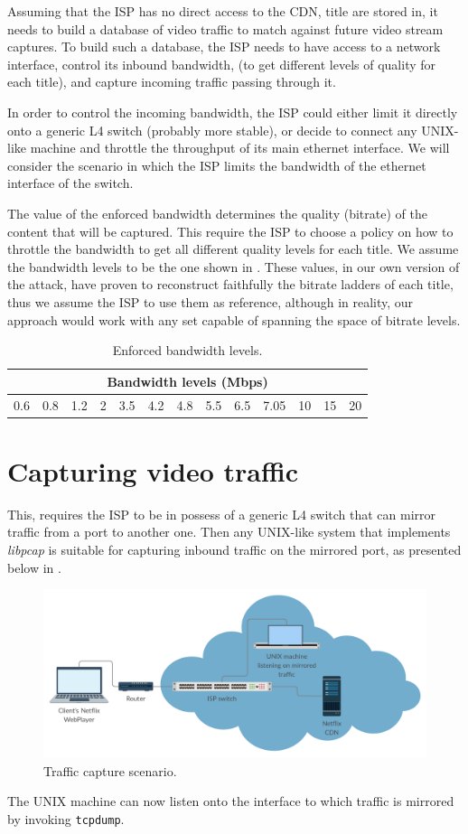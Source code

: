 Assuming that the ISP has no direct access to the CDN, title are stored in, it
needs to build a database of video traffic to match against future video stream
captures. To build such a database, the ISP needs to have access to a network
interface, control its inbound bandwidth, (to get different levels of quality
for each title), and capture incoming traffic passing through it.

In order to control the incoming bandwidth, the ISP could either limit it
directly onto a generic L4 switch (probably more stable), or decide to connect
any UNIX-like machine and throttle the throughput of its main ethernet
interface. We will consider the scenario in which the ISP limits the bandwidth
of the ethernet interface of the switch.

The value of the enforced bandwidth determines the quality (bitrate) of the
content that will be captured. This require the ISP to choose a policy on how
to throttle the bandwidth to get all different quality levels for each title.
We assume the bandwidth levels to be the one shown in .
These values, in our own version of the attack, have proven to reconstruct
faithfully the bitrate ladders of each title, thus we assume the ISP to use
them as reference, although in reality, our approach would work with any set
capable of spanning the space of bitrate levels.

\begin{table}[htb]
  \centering
  \begin{tabular}{|c|c|c|c|c|c|c|c|c|c|c|c|c|}
    \hline
    \multicolumn{13}{|c|}{\textbf{Bandwidth levels (Mbps)}} \\
    \hline
    0.6 & 0.8 & 1.2 & 2 & 3.5 & 4.2 & 4.8 & 5.5 & 6.5 & 7.05 & 10 & 15 & 20 \\ 
    \hline
  \end{tabular}
  \caption{Enforced bandwidth levels.}
  \label{tab:bandwidths}
\end{table}


\section{Capturing video traffic}

This, requires the ISP to be in possess of a generic L4 switch that can mirror
traffic from a port to another one. Then any UNIX-like system that implements
\emph{libpcap} is suitable for capturing inbound traffic on the mirrored port, as
presented below in .

\begin{figure}[!htb]
  \centering
  \includegraphics[width=0.9\columnwidth]{img/schema.png}
  \caption{Traffic capture scenario.}
  \label{fig:schema}
\end{figure}

The UNIX machine can now listen onto the interface to which traffic is mirrored
by invoking \texttt{tcpdump}. 
